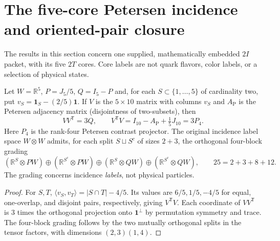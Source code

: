 \documentclass[11pt]{article}
\begin{document}
\section{The five-core Petersen incidence and oriented-pair closure}
\label{p1:sec:v338-five-core-incidence}
The results in this section concern one supplied, mathematically embedded
$2I$ packet, with its five $2T$ cores.  Core labels are not
quark flavors, color labels, or a selection of physical states.

\begin{theorem}
\label{p1:thm:v338-petersen-tight-frame}
Let $W=\mathbb R^5$, $P=J_5/5$, $Q=I_5-P$ and, for each
$S\subset\{1,\ldots,5\}$ of cardinality two, put
$v_S=\mathbf1_S-(2/5)\mathbf1$.  If $V$ is the $5\times10$ matrix
with columns $v_S$ and $A_{\mathrm P}$ is the Petersen adjacency
matrix (disjointness of two-subsets), then
\[
 VV^{\mathsf T}=3Q,\qquad
 V^{\mathsf T}V=I_{10}-A_{\mathrm P}+\tfrac15J_{10}=3P_{4}.
\]
Here $P_4$ is the rank-four Petersen contrast projector.  The
original incidence label space $W\otimes W$ admits, for each split
$S\sqcup S^c$ of sizes $2+3$, the orthogonal four-block grading
\[
 (\mathbb R^S\otimes PW)\oplus(\mathbb R^{S^c}\otimes PW)
 \oplus(\mathbb R^S\otimes QW)\oplus(\mathbb R^{S^c}\otimes QW),
 \qquad 25=2+3+8+12.
\]
The grading concerns incidence \emph{labels}, not physical particles.
\end{theorem}
\begin{proof}
For $S,T$, $\langle v_S,v_T\rangle=|S\cap T|-4/5$.
Its values are $6/5,1/5,-4/5$ for equal, one-overlap, and
disjoint pairs, respectively, giving $V^{\mathsf T}V$.
Each coordinate of $VV^{\mathsf T}$ is $3$ times the orthogonal
projection onto $\mathbf1^\perp$ by permutation symmetry and trace.
The four-block grading follows by the two mutually orthogonal
splits in the tensor factors, with dimensions $(2,3)(1,4)$.
\end{proof}
\end{document}
